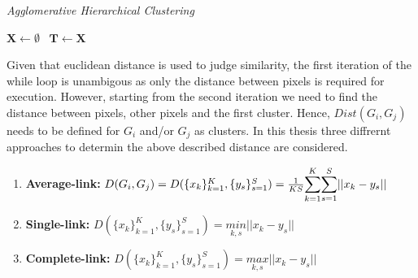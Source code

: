 \documentclass[aodsor,preprint]{imsart}
\numberwithin{equation}{section}
\theoremstyle{plain}
\begin{document}
{}
\begin{algorithm}[hbt!]
	\caption{\textit{Agglomerative Hierarchical Clustering}}\label{alg:one}
	$\mathbf{X} \gets \emptyset$\ 
	$\mathbf{T} \gets \mathbf{X}$
\end{algorithm}

Given that euclidean distance is used to judge similarity, the first iteration of the while loop is unambigous as only the distance between pixels is required for execution. However, starting from the second iteration we need to find the distance between pixels, other pixels and the first cluster. Hence, $Dist(G_i, G_j)$ needs to be defined for $G_i$ and/or $G_j$ as clusters. In this thesis three diffrernt approaches to determin the above described distance are considered.

\begin{enumerate}
	\item \textbf{Average-link:} $D(G_i, G_j) = D(\{x_k\}_{k = 1}^K, \{y_s\}_{s = 1}^S) = \frac{1}{KS} \mathlarger{\sum}_{k = 1}^K \mathlarger{\sum}_{s = 1}^S \lvert\lvert x_k - y_s\rvert \rvert$
	
	\item \textbf{Single-link:} $D(\{x_k\}_{k = 1}^K, \{y_s\}_{s = 1}^S) = \underset{k, s}{min} \lvert \lvert x_k - y_s\rvert \rvert$
	
	\item \textbf{Complete-link:}  $D(\{x_k\}_{k = 1}^K, \{y_s\}_{s = 1}^S) = \underset{k, s}{max} \lvert \lvert x_k - y_s\rvert \rvert$
\end{enumerate}
\end{document}
